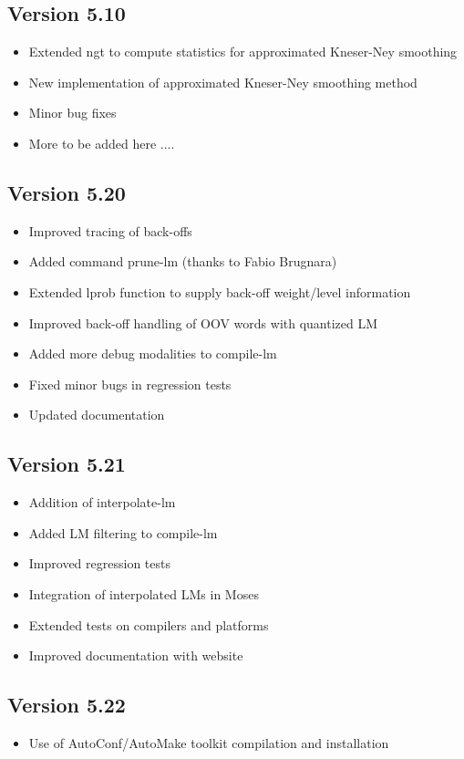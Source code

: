 \documentclass[11pt]{article}
\begin{document}
\subsection{Version 5.10}
\begin{itemize}
\item Extended ngt to compute statistics for approximated Kneser-Ney smoothing
\item New implementation of approximated Kneser-Ney smoothing method
\item Minor bug fixes
\item More to be added here ....
\end{itemize}

\subsection{Version 5.20}
\begin{itemize}
\item Improved tracing of back-offs
\item Added command prune-lm  (thanks to Fabio Brugnara)
\item Extended lprob function to supply back-off weight/level information
\item Improved back-off handling of OOV words with quantized LM
\item Added more debug modalities to compile-lm
\item Fixed minor bugs in regression tests
\item Updated documentation
\end{itemize}

\subsection{Version 5.21}
\begin{itemize}
\item Addition of interpolate-lm 
\item Added LM filtering to compile-lm
\item Improved regression tests
\item Integration of interpolated LMs in Moses
\item Extended tests on compilers and platforms
\item Improved documentation with website
\end{itemize}

\subsection{Version 5.22}
\begin{itemize}
\item Use of AutoConf/AutoMake toolkit compilation and installation
\end{itemize}
\end{document}
